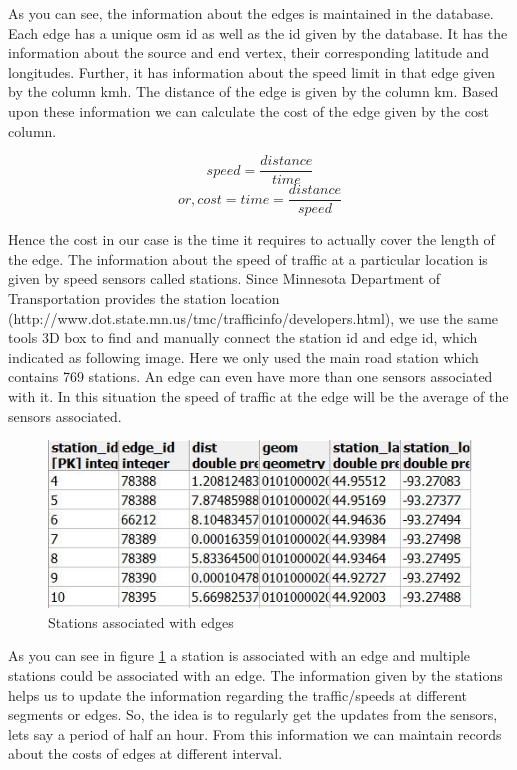 \documentclass[a4paper,12pt, notitlepage, oneside, onecolumn]{article}
\begin{document}
As you can see, the information about the edges is maintained in the database. Each edge has a unique osm id as well as the id given by the database. It has the information about the source and end vertex, their corresponding latitude and longitudes. Further, it has information about the speed limit in that edge given by the column kmh. The distance of the edge is given by the column km. Based upon these information we can calculate the cost of the edge given by the cost column. 

\begin{equation*}
speed = \frac{distance}{time}
\end{equation*}
\begin{equation*}
or,  cost=time=\frac{distance}{speed}
\end{equation*}

Hence the cost in our case is the time it requires to actually cover the length of the edge.
The information about the speed of traffic at a particular location is given  by speed sensors called stations. Since Minnesota Department of Transportation provides the station location (http://www.dot.state.mn.us/tmc/trafficinfo/developers.html), we use the same tools 3D box to find and manually connect the station id and edge id, which indicated as following image. Here we only used the main road station which contains 769 stations. An edge can even have more than one sensors associated with it. In this situation the speed of traffic at the edge will be the average of the sensors associated.

\begin{figure}[H]
\begin{minipage}[b]{1.0\linewidth}
\centering
\includegraphics[scale=0.6]{station_edge.jpg}
\caption{Stations associated with edges}
\label{fig:station_edge}
\end{minipage}
\centering
\end{figure}

As you can see in figure \ref{fig:station_edge} a station is associated with an edge and multiple stations could be associated with an edge. The information given by the stations helps us to update the information regarding the traffic/speeds at different segments or edges. So, the idea is to regularly get the updates from the sensors, lets say a period of half an hour. From this information we can maintain records about the costs of edges at different interval.
\end{document}
